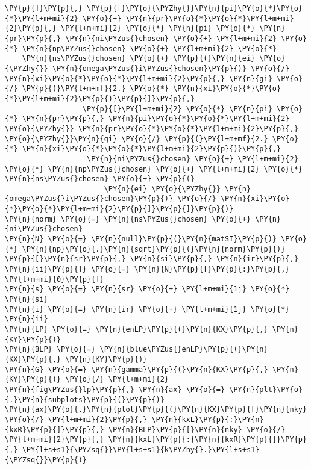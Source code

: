 \begin{Verbatim}[commandchars=\\\{\}]
\PY{p}{]}\PY{p}{,} \PY{p}{[}\PY{o}{\PYZhy{}}\PY{n}{pi}\PY{o}{*}\PY{o}{*}\PY{l+m+mi}{2} \PY{o}{+} \PY{n}{pr}\PY{o}{*}\PY{o}{*}\PY{l+m+mi}{2}\PY{p}{,} \PY{l+m+mi}{2} \PY{o}{*} \PY{n}{pi} \PY{o}{*} \PY{n}{pr}\PY{p}{,} \PY{n}{ni\PYZus{}chosen} \PY{o}{+} \PY{l+m+mi}{2} \PY{o}{*} \PY{n}{np\PYZus{}chosen} \PY{o}{+} \PY{l+m+mi}{2} \PY{o}{*}
    \PY{n}{ns\PYZus{}chosen} \PY{o}{+} \PY{p}{(}\PY{n}{ei} \PY{o}{\PYZhy{}} \PY{n}{omega\PYZus{}i\PYZus{}chosen}\PY{p}{)} \PY{o}{/} \PY{n}{xi}\PY{o}{*}\PY{o}{*}\PY{l+m+mi}{2}\PY{p}{,} \PY{n}{gi} \PY{o}{/} \PY{p}{(}\PY{l+m+mf}{2.} \PY{o}{*} \PY{n}{xi}\PY{o}{*}\PY{o}{*}\PY{l+m+mi}{2}\PY{p}{)}\PY{p}{]}\PY{p}{,}
                  \PY{p}{[}\PY{l+m+mi}{2} \PY{o}{*} \PY{n}{pi} \PY{o}{*} \PY{n}{pr}\PY{p}{,} \PY{n}{pi}\PY{o}{*}\PY{o}{*}\PY{l+m+mi}{2} \PY{o}{\PYZhy{}} \PY{n}{pr}\PY{o}{*}\PY{o}{*}\PY{l+m+mi}{2}\PY{p}{,} \PY{o}{\PYZhy{}}\PY{n}{gi} \PY{o}{/} \PY{p}{(}\PY{l+m+mf}{2.} \PY{o}{*} \PY{n}{xi}\PY{o}{*}\PY{o}{*}\PY{l+m+mi}{2}\PY{p}{)}\PY{p}{,}
                   \PY{n}{ni\PYZus{}chosen} \PY{o}{+} \PY{l+m+mi}{2} \PY{o}{*} \PY{n}{np\PYZus{}chosen} \PY{o}{+} \PY{l+m+mi}{2} \PY{o}{*} \PY{n}{ns\PYZus{}chosen} \PY{o}{+} \PY{p}{(}
                       \PY{n}{ei} \PY{o}{\PYZhy{}} \PY{n}{omega\PYZus{}i\PYZus{}chosen}\PY{p}{)} \PY{o}{/} \PY{n}{xi}\PY{o}{*}\PY{o}{*}\PY{l+m+mi}{2}\PY{p}{]}\PY{p}{]}\PY{p}{)}
\PY{n}{norm} \PY{o}{=} \PY{n}{ns\PYZus{}chosen} \PY{o}{+} \PY{n}{ni\PYZus{}chosen}
\PY{n}{N} \PY{o}{=} \PY{n}{null}\PY{p}{(}\PY{n}{matSI}\PY{p}{)} \PY{o}{*} \PY{n}{np}\PY{o}{.}\PY{n}{sqrt}\PY{p}{(}\PY{n}{norm}\PY{p}{)}
\PY{p}{[}\PY{n}{sr}\PY{p}{,} \PY{n}{si}\PY{p}{,} \PY{n}{ir}\PY{p}{,} \PY{n}{ii}\PY{p}{]} \PY{o}{=} \PY{n}{N}\PY{p}{[}\PY{p}{:}\PY{p}{,} \PY{l+m+mi}{0}\PY{p}{]}
\PY{n}{s} \PY{o}{=} \PY{n}{sr} \PY{o}{+} \PY{l+m+mi}{1j} \PY{o}{*} \PY{n}{si}
\PY{n}{i} \PY{o}{=} \PY{n}{ir} \PY{o}{+} \PY{l+m+mi}{1j} \PY{o}{*} \PY{n}{ii}
\PY{n}{LP} \PY{o}{=} \PY{n}{enLP}\PY{p}{(}\PY{n}{KX}\PY{p}{,} \PY{n}{KY}\PY{p}{)}
\PY{n}{BLP} \PY{o}{=} \PY{n}{blue\PYZus{}enLP}\PY{p}{(}\PY{n}{KX}\PY{p}{,} \PY{n}{KY}\PY{p}{)}
\PY{n}{G} \PY{o}{=} \PY{n}{gamma}\PY{p}{(}\PY{n}{KX}\PY{p}{,} \PY{n}{KY}\PY{p}{)} \PY{o}{/} \PY{l+m+mi}{2}
\PY{n}{fig\PYZus{}lp}\PY{p}{,} \PY{n}{ax} \PY{o}{=} \PY{n}{plt}\PY{o}{.}\PY{n}{subplots}\PY{p}{(}\PY{p}{)}
\PY{n}{ax}\PY{o}{.}\PY{n}{plot}\PY{p}{(}\PY{n}{KX}\PY{p}{[}\PY{n}{nky} \PY{o}{/} \PY{l+m+mi}{2}\PY{p}{,} \PY{n}{kxL}\PY{p}{:}\PY{n}{kxR}\PY{p}{]}\PY{p}{,} \PY{n}{BLP}\PY{p}{[}\PY{n}{nky} \PY{o}{/} \PY{l+m+mi}{2}\PY{p}{,} \PY{n}{kxL}\PY{p}{:}\PY{n}{kxR}\PY{p}{]}\PY{p}{,} \PY{l+s+s1}{\PYZsq{}}\PY{l+s+s1}{k\PYZhy{}.}\PY{l+s+s1}{\PYZsq{}}\PY{p}{)}

\end{Verbatim}
